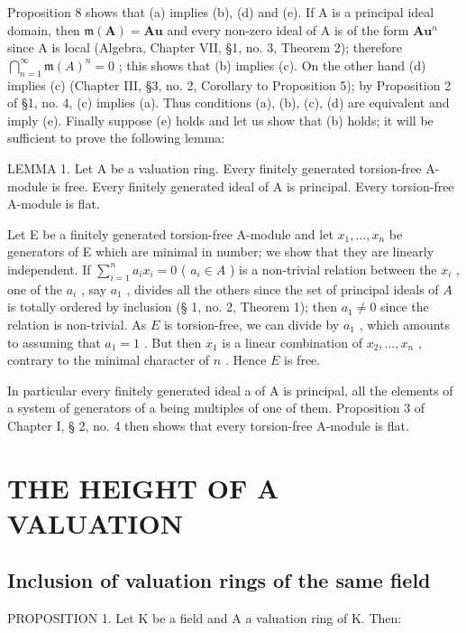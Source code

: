 Proposition 8 shows that (a) implies (b), (d) and (e). If A is a principal ideal domain, then \(\mathfrak{m}(\mathbf{A}) = \mathbf{A}\mathbf{u}\) and every non-zero ideal of A is of the form \(\mathbf{A}\mathbf{u}^n\) since A is local (Algebra, Chapter VII, §1, no. 3, Theorem 2); therefore \(\bigcap_{n=1}^{\infty} \mathfrak{m}(A)^n = 0\) ; this shows that (b) implies (c). On the other hand (d) implies (c) (Chapter III, §3, no. 2, Corollary to Proposition 5); by Proposition 2 of §1, no. 4, (c) implies (a). Thus conditions (a), (b), (c), (d) are equivalent and imply (e). Finally suppose (e) holds and let us show that (b) holds; it will be sufficient to prove the following lemma:

LEMMA 1. Let A be a valuation ring. Every finitely generated torsion-free A-module is free. Every finitely generated ideal of A is principal. Every torsion-free A-module is flat.

Let E be a finitely generated torsion-free A-module and let \(x_{1}, \ldots, x_{n}\) be generators of E which are minimal in number; we show that they are linearly independent. If \(\sum_{i=1}^{n} a_i x_i = 0\) ( \(a_i \in A\) ) is a non-trivial relation between the \(x_i\) , one of the \(a_i\) , say \(a_1\) , divides all the others since the set of principal ideals of \(A\) is totally ordered by inclusion (§ 1, no. 2, Theorem 1); then \(a_1 \neq 0\) since the relation is non-trivial. As \(E\) is torsion-free, we can divide by \(a_1\) , which amounts to assuming that \(a_1 = 1\) . But then \(x_1\) is a linear combination of \(x_2, \ldots, x_n\) , contrary to the minimal character of \(n\) . Hence \(E\) is free.

In particular every finitely generated ideal a of A is principal, all the elements of a system of generators of a being multiples of one of them. Proposition 3 of Chapter I, § 2, no. 4 then shows that every torsion-free A-module is flat.

\section{THE HEIGHT OF A VALUATION}

\subsection{Inclusion of valuation rings of the same field}

PROPOSITION 1. Let K be a field and A a valuation ring of K. Then:

